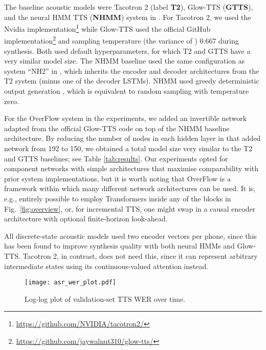 \documentclass[british]{INTERSPEECH2023_arxiv}
\begin{document}
The baseline acoustic models were Tacotron 2 \cite{shen2018natural} (label \textbf{T2}), Glow-TTS \cite{kim2020glow} (\textbf{GTTS}), and the neural HMM TTS (\textbf{NHMM}) system in \cite{mehta2022neural}.
For Tacotron 2, we used the Nvidia implementation\footnote{\href{https://github.com/NVIDIA/tacotron2/}{https://github.com/NVIDIA/tacotron2/}} while Glow-TTS used the official GitHub implementation\footnote{\href{https://github.com/jaywalnut310/glow-tts/}{https://github.com/jaywalnut310/glow-tts/}} and sampling temperature (the variance of ) 0.667 during synthesis.
Both used default hyperparameters, for which T2 and GTTS have a very similar model size.
The NHMM baseline used the same configuration as system ``NH2'' in \cite{mehta2022neural}, which inherits the encoder and decoder architectures from the T2 system (minus one of the decoder LSTMs).
NHMM used greedy deterministic output generation , which is equivalent to random sampling with temperature zero.

For the OverFlow system in the experiments, we added an invertible network adapted from the official Glow-TTS code on top of the NHMM baseline architecture.
By reducing the number of nodes in each hidden layer in that added network from 192 to 150, we obtained a total model size very similar to the T2 and GTTS baselines; see Table \ref{tab:results}.
Our experiments opted for component networks with simple architectures that maximise comparability with prior system implementations, but it is worth noting that OverFlow is a framework within which many different network architectures can be used. 
It is, e.g., entirely possible to employ Transformers \cite{vaswani2017attention} inside any of the blocks in Fig.\ \ref{fig:overview}, or, for incremental TTS, one might swap in a causal encoder architecture with optional finite-horizon look-ahead.



All discrete-state acoustic models used two encoder vectors per phone, since this has been found to improve synthesis quality with both neural HMMs and Glow-TTS.
Tacotron 2, in contrast, does not need this, since it 
can represent arbitrary intermediate states using its continuous-valued attention instead.

\begin{figure}
\centering
\texttt{[image: asr\_wer\_plot.pdf]}
\caption{Log-log plot of validation-set TTS WER over time.}
\label{fig:wer}
\vspace{-1.5\baselineskip}
\end{figure}
\end{document}
